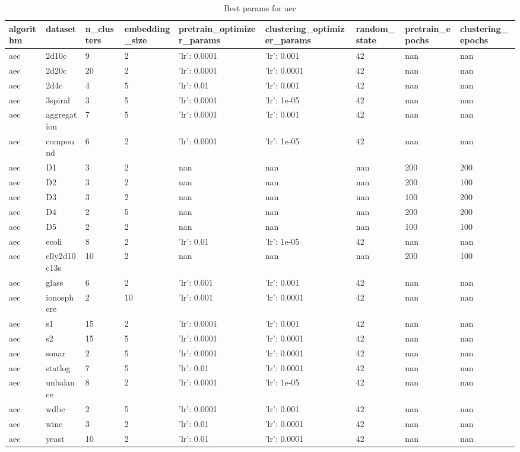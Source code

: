 \begin{table}[H]
\centering
\caption{Best params for aec}
\label{tab:params:aec}
\begin{tabular}{|l|l|l|l|l|l|l|l|l|}
\hline
algorithm & dataset & n\_clusters & embedding\_size & pretrain\_optimizer\_params & clustering\_optimizer\_params & random\_state & pretrain\_epochs & clustering\_epochs \\
\hline
aec & 2d10c & 9 & 2 & {'lr': 0.0001} & {'lr': 0.001} & 42 & nan & nan \\
\hline
aec & 2d20c & 20 & 2 & {'lr': 0.0001} & {'lr': 0.0001} & 42 & nan & nan \\
\hline
aec & 2d4c & 4 & 5 & {'lr': 0.01} & {'lr': 0.001} & 42 & nan & nan \\
\hline
aec & 3spiral & 3 & 5 & {'lr': 0.0001} & {'lr': 1e-05} & 42 & nan & nan \\
\hline
aec & aggregation & 7 & 5 & {'lr': 0.0001} & {'lr': 0.001} & 42 & nan & nan \\
\hline
aec & compound & 6 & 2 & {'lr': 0.0001} & {'lr': 1e-05} & 42 & nan & nan \\
\hline
aec & D1 & 3 & 2 & nan & nan & nan & 200 & 200 \\
\hline
aec & D2 & 3 & 2 & nan & nan & nan & 200 & 100 \\
\hline
aec & D3 & 3 & 2 & nan & nan & nan & 100 & 200 \\
\hline
aec & D4 & 2 & 5 & nan & nan & nan & 200 & 200 \\
\hline
aec & D5 & 2 & 2 & nan & nan & nan & 100 & 100 \\
\hline
aec & ecoli & 8 & 2 & {'lr': 0.01} & {'lr': 1e-05} & 42 & nan & nan \\
\hline
aec & elly2d10c13s & 10 & 2 & nan & nan & nan & 200 & 100 \\
\hline
aec & glass & 6 & 2 & {'lr': 0.001} & {'lr': 0.001} & 42 & nan & nan \\
\hline
aec & ionosphere & 2 & 10 & {'lr': 0.001} & {'lr': 0.0001} & 42 & nan & nan \\
\hline
aec & s1 & 15 & 2 & {'lr': 0.0001} & {'lr': 0.001} & 42 & nan & nan \\
\hline
aec & s2 & 15 & 5 & {'lr': 0.0001} & {'lr': 0.0001} & 42 & nan & nan \\
\hline
aec & sonar & 2 & 5 & {'lr': 0.0001} & {'lr': 0.0001} & 42 & nan & nan \\
\hline
aec & statlog & 7 & 5 & {'lr': 0.01} & {'lr': 0.0001} & 42 & nan & nan \\
\hline
aec & unbalance & 8 & 2 & {'lr': 0.0001} & {'lr': 1e-05} & 42 & nan & nan \\
\hline
aec & wdbc & 2 & 5 & {'lr': 0.0001} & {'lr': 0.001} & 42 & nan & nan \\
\hline
aec & wine & 3 & 2 & {'lr': 0.01} & {'lr': 0.0001} & 42 & nan & nan \\
\hline
aec & yeast & 10 & 2 & {'lr': 0.01} & {'lr': 0.0001} & 42 & nan & nan \\
\hline
\end{tabular}
\end{table}